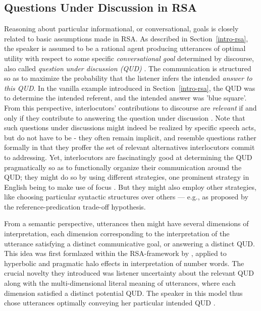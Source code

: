 \subsection{Questions Under Discussion in RSA}
Reasoning about particular informational, or conversational, goals is closely related to basic assumptions made in RSA.
As described in Section~\ref{intro-rsa}, the speaker is assumed to be a rational agent producing utterances of optimal utility with respect to some specific \emph{conversational goal} determined by discourse, also called \emph{question under discussion (QUD)}  \parencite{lassiter2017adjectival, roberts2012information}. The communication is structured so as to maximize the probability that the listener infers the intended \emph{answer to this QUD}. In the vanilla example introduced in Section~\ref{intro-rsa}, the QUD was to determine the intended referent, and the intended answer was 'blue square'. From this perspective, interlocutors' contributions to discourse are \emph{relevant} if and only if they contribute to answering the question under discussion \parencite{roberts2012information}. Note that such questions under discussions might indeed be realized by specific speech acts, but do not have to be - they often remain implicit, and resemble questions rather formally in that they proffer the set of relevant alternatives interlocutors commit to addressing. Yet, interlocutors are fascinatingly good at determining the QUD pragmatically so as to functionally organize their communication around the QUD; they might do so by using different strategies, one prominent strategy in English being to make use of focus \parencite{roberts2012information, krifka2008basic}. But they might also employ other strategies, like choosing particular syntactic structures over others --- e.g., as proposed by the reference-predication trade-off hypothesis.  

From a semantic perspective, utterances then might have several dimensions of interpretation, each dimension corresponding to the interpretation of the utterance satisfying a distinct communicative goal, or answering a distinct QUD. This idea was first formlazed within the RSA-framework by \textcite{kao2014nonliteral}, applied to hyperbolic and pragmatic halo effects in interpretation of number words. The crucial novelty they introduced was listener uncertainty about the relevant QUD along with the multi-dimensional literal meaning of utterances, where each dimension satisfied a distinct potential QUD. The speaker in this model thus chose utterances optimally conveying her particular intended QUD \parencite{kao2014nonliteral}. %

